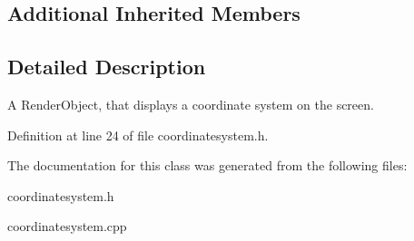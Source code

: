 \subsection*{Additional Inherited Members}


\subsection{Detailed Description}
A Render\-Object, that displays a coordinate system on the screen. 

Definition at line 24 of file coordinatesystem.\-h.



The documentation for this class was generated from the following files\-:\begin{DoxyCompactItemize}
\item 
coordinatesystem.\-h\item 
coordinatesystem.\-cpp\end{DoxyCompactItemize}
